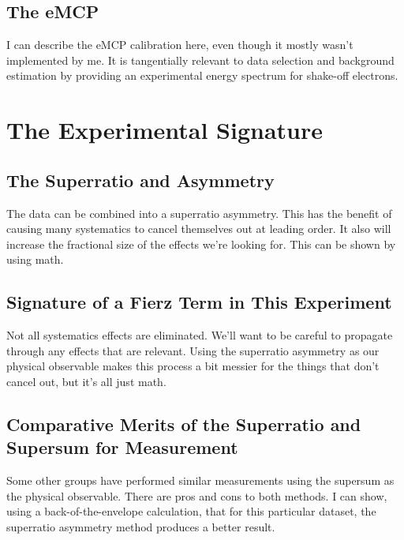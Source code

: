 \section{The eMCP}
	I can describe the eMCP calibration here, even though it mostly wasn't implemented by me.  It is tangentially relevant to data selection and background estimation by providing an experimental energy spectrum for shake-off electrons.  
	
	
\clearpage	
\chapter{The Experimental Signature}
\label{analysis_chapter}

\section{The Superratio and Asymmetry}
	The data can be combined into a superratio asymmetry.  This has the benefit of causing many systematics to cancel themselves out at leading order.  It also will increase the fractional size of the effects we're looking for.  This can be shown by using math.  
	
\section{Signature of a Fierz Term in This Experiment}
	Not all systematics effects are eliminated.  We'll want to be careful to propagate through any effects that are relevant.  Using the superratio asymmetry as our physical observable makes this process a bit messier for the things that don't cancel out, but it's all just math.  
	
\section{Comparative Merits of the Superratio and Supersum for Measurement}
	Some other groups have performed similar measurements using the supersum as the physical observable.  There are pros and cons to both methods.  I can show, using a back-of-the-envelope calculation, that for this particular dataset, the superratio asymmetry method produces a better result.  
	

